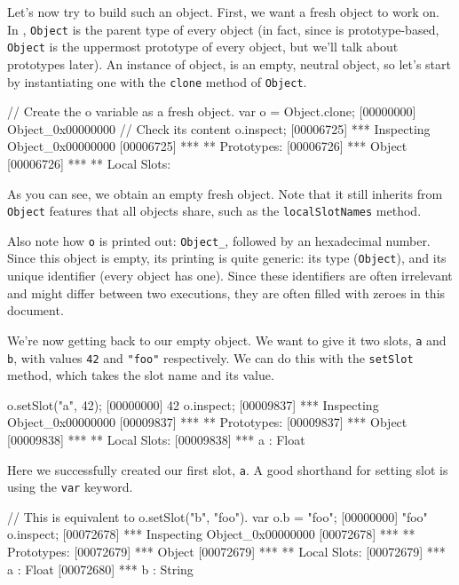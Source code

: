 Let's now try to build such an object. First, we want a fresh object
to work on. In \us, \lstinline{Object} is the parent type of every
object (in fact, since \us is prototype-based, \lstinline{Object} is
the uppermost prototype of every object, but we'll talk about
prototypes later). An instance of object, is an empty, neutral object,
so let's start by instantiating one with the \lstinline{clone} method
of \lstinline{Object}.

\begin{urbiscript}
// Create the o variable as a fresh object.
var o = Object.clone;
[00000000] Object_0x00000000
// Check its content
o.inspect;
[00006725] *** Inspecting Object_0x00000000
[00006725] *** ** Prototypes:
[00006726] ***   Object
[00006726] *** ** Local Slots:
\end{urbiscript}

As you can see, we obtain an empty fresh object. Note that it still
inherits from \lstinline{Object} features that all objects share, such as
the \lstinline{localSlotNames} method.

Also note how \lstinline{o} is printed out: \lstinline{Object_},
followed by an hexadecimal number. Since this object is empty, its
printing is quite generic: its type (\lstinline{Object}), and its
unique identifier (every \us object has one). Since these identifiers
are often irrelevant and might differ between two executions, they are
often filled with zeroes in this document.

We're now getting back to our empty object. We want to give it two
slots, \lstinline{a} and \lstinline{b}, with values \lstinline|42| and
\lstinline|"foo"| respectively. We can do this with the
\lstinline{setSlot} method, which takes the slot name and
its value.

\begin{urbiscript}
o.setSlot("a", 42);
[00000000] 42
o.inspect;
[00009837] *** Inspecting Object_0x00000000
[00009837] *** ** Prototypes:
[00009837] ***   Object
[00009838] *** ** Local Slots:
[00009838] ***   a : Float
\end{urbiscript}

Here we successfully created our first slot, \lstinline|a|. A good
shorthand for setting slot is using the \lstinline{var} keyword.

\begin{urbiscript}
// This is equivalent to o.setSlot("b", "foo").
var o.b = "foo";
[00000000] "foo"
o.inspect;
[00072678] *** Inspecting Object_0x00000000
[00072678] *** ** Prototypes:
[00072679] ***   Object
[00072679] *** ** Local Slots:
[00072679] ***   a : Float
[00072680] ***   b : String
\end{urbiscript}

